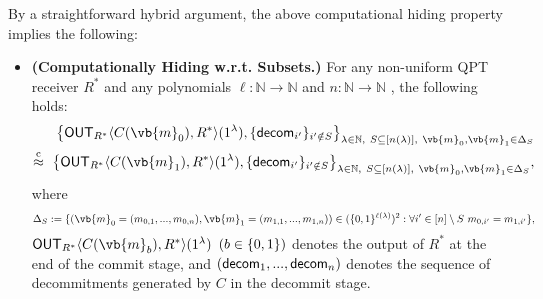 \begin{remark}
By a straightforward hybrid argument, the above computational hiding property implies the following: 
\begin{itemize}
\item
{\bf (Computationally Hiding w.r.t. Subsets.)} For any non-uniform QPT receiver $R^*$ and any polynomials $\ell : \mathbb{N} \rightarrow \mathbb{N}$
and 
$n : \mathbb{N} \rightarrow \mathbb{N}$
, the following holds:
\begin{align*}
\big\{ \OUT_{R^*}\langle C(\vb{m}_0),R^* \rangle(1^\secpar),\{\decom_{i'}\}_{i'\notin S}\big\}_{\secpar \in \mathbb{N},~S\subseteq[n(\secpar)], ~\vb{m}_0, \vb{m}_1 \in \Delta_S}\\
\cind~ \big\{ \OUT_{R^*}\langle C(\vb{m}_1),R^* \rangle(1^\secpar),\{\decom_{i'}\}_{i'\notin S}\big\}_{\secpar \in \mathbb{N},~S\subseteq [n(\secpar)],  ~\vb{m}_0, \vb{m}_1 \in \Delta_S},
\end{align*}
where 
$$\Delta_S:=\{(\vb{m}_0=(m_{0,1},...,m_{0,n}), \vb{m}_1=(m_{1,1},...,m_{1,n}))\in (\bits^{\ell(\secpar)})^2
: \forall i'\in[n]\setminus S~m_{0,i'}=m_{1,i'}\}
,$$ 
$\OUT_{R^*}\langle C(\vb{m}_b),R^* \rangle(1^\secpar)$ $(b \in \{0,1\})$ denotes the output of $R^*$ at the end of the commit stage, 
and $(\mathsf{decom}_1,...,\mathsf{decom}_n)$ denotes the sequence of decommitments generated by $C$ in the decommit stage.
\end{itemize}
\end{remark}



